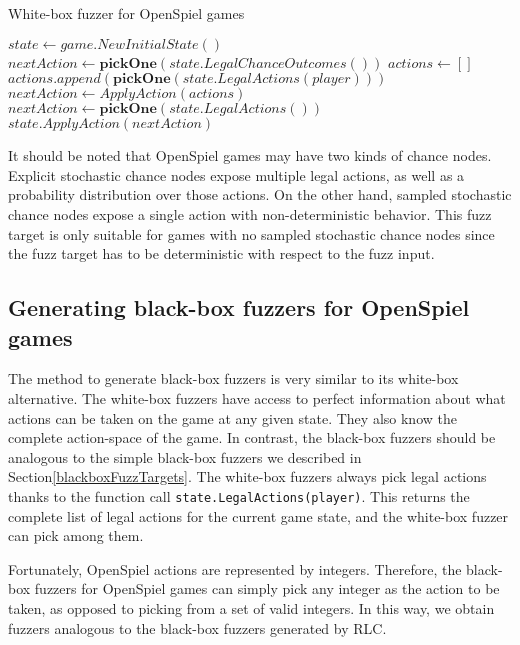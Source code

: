 \begin{algorithm}[H]
    \caption{White-box fuzzer for OpenSpiel games}
    \label{alg:var}
    \begin{algorithmic}[1]
    \STATE $state \gets game.NewInitialState()$
            \STATE $nextAction \gets \pmb{pickOne}(state.LegalChanceOutcomes())$
            \STATE $actions \gets []$
                \STATE $actions.append(\pmb{pickOne}(state.LegalActions(player)))$
            \ENDFOR
            \STATE $nextAction \gets ApplyAction(actions)$
        \ELSE
            \STATE $nextAction \gets \pmb{pickOne}(state.LegalActions())$
        \ENDIF
        \STATE $state.ApplyAction(nextAction)$
    \ENDWHILE
    \end{algorithmic}
\end{algorithm}

It should be noted that OpenSpiel games may have two kinds of chance nodes. Explicit stochastic chance nodes
expose multiple legal actions, as well as a probability distribution over those actions. On the other hand, 
sampled stochastic chance nodes expose a single action with non-deterministic behavior. This fuzz target is 
only suitable for games with no sampled stochastic chance nodes since the fuzz target has to be deterministic
with respect to the fuzz input.

\subsection{Generating black-box fuzzers for OpenSpiel games} \label{osBlackBox}
The method to generate black-box fuzzers is very similar to its white-box alternative.
The white-box fuzzers have access to perfect information about what actions can be taken on the game at any given state.
They also know the complete action-space of the game.
In contrast, the black-box fuzzers should be analogous to the simple black-box fuzzers we described in Section\ref{blackboxFuzzTargets}.
The white-box fuzzers always pick legal actions thanks to the function call \texttt{state.LegalActions(player)}.
This returns the complete list of legal actions for the current game state, and the white-box fuzzer can pick among them.

Fortunately, OpenSpiel actions are represented by integers.
Therefore, the black-box fuzzers for OpenSpiel games can simply pick any integer as the action to be taken, as opposed to picking from a set of valid integers.
In this way, we obtain fuzzers analogous to the black-box fuzzers generated by RLC.


